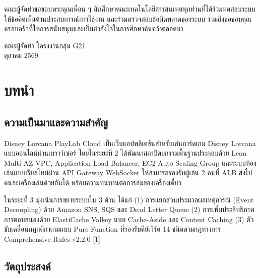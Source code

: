 \documentclass[12pt,a4paper]{report}
\begin{document}
คณะผู้จัดทำขอขอบพระคุณเพื่อน ๆ นักศึกษาคณะเทคโนโลยีสารสนเทศทุกท่านที่ได้ร่วมทดสอบระบบ ให้ข้อคิดเห็นด้านประสบการณ์การใช้งาน และร่วมตรวจสอบข้อผิดพลาดของระบบ รวมถึงขอขอบคุณครอบครัวที่ให้การสนับสนุนและเป็นกำลังใจในการศึกษาค้นคว้าตลอดมา

\vspace{1.2cm}
\begin{flushright}
    คณะผู้จัดทำ โครงงานกลุ่ม G21\\
    ตุลาคม 2569
\end{flushright}

\newpage

\tableofcontents
\newpage
\listoftables
\newpage

\setcounter{page}{1}

\chapter{บทนำ}

\section{ความเป็นมาและความสำคัญ}

Disney Lorcana PlayLab Cloud เป็นเว็บแอปพลิเคชันสำหรับเล่นการ์ดเกม Disney Lorcana แบบออนไลน์ผ่านเบราว์เซอร์ โดยในระยะที่ 2 ได้พัฒนาสถาปัตยกรรมพื้นฐานประกอบด้วย Lean Multi-AZ VPC, Application Load Balancer, EC2 Auto Scaling Group และระบบห้องเล่นแบบเรียลไทม์ผ่าน API Gateway WebSocket ให้สามารถรองรับผู้เล่น 2 คนที่ ALB ส่งไปคนละเครื่องเล่นด้วยกันได้ พร้อมความทนทานต่อการล่มของเครื่องเดี่ยว

ในระยะที่ 3 มุ่งเน้นการขยายระบบใน 3 ด้าน ได้แก่ (1) การแยกส่วนประมวลผลเหตุการณ์ (Event Decoupling) ด้วย Amazon SNS, SQS และ Dead Letter Queue (2) การเพิ่มประสิทธิภาพการตอบสนองด้วย ElastiCache Valkey แบบ Cache-Aside และ Content Caching (3) ตัวขับเคลื่อนกฎกติกาเกมแบบ Pure Function ที่รองรับคีย์เวิร์ด 14 ชนิดตามกฎทางการ Comprehensive Rules v2.2.0 [1]

\section{วัตถุประสงค์}
\end{document}
